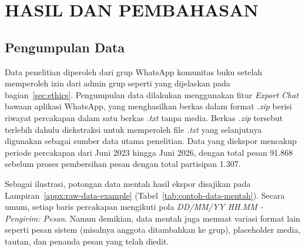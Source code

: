 %

\chapter{HASIL DAN PEMBAHASAN}

\section{Pengumpulan Data}
\label{sec:data-collection}

Data penelitian diperoleh dari grup WhatsApp komunitas buku setelah memperoleh izin dari admin grup seperti yang dijelaskan pada bagian~\ref{sec:ethics}.
Pengumpulan data dilakukan menggunakan fitur \textit{Export Chat} bawaan aplikasi WhatsApp, yang menghasilkan berkas dalam format \textit{.zip} berisi riwayat percakapan dalam satu berkas \textit{.txt} tanpa media.
Berkas \textit{.zip} tersebut terlebih dahulu diekstraksi untuk memperoleh file \textit{.txt} yang selanjutnya digunakan sebagai sumber data utama penelitian.
Data yang diekspor mencakup periode percakapan dari Juni 2023 hingga Juni 2026, dengan total pesan 91.868 sebelum proses pembersihan pesan dengan total partisipan 1.307.

Sebagai ilustrasi, potongan data mentah hasil ekspor disajikan pada Lampiran~\ref{appx:raw-data-example} (Tabel~\ref{tab:contoh-data-mentah}).
Secara umum, setiap baris percakapan mengikuti pola \textit{DD/MM/YY HH.MM - Pengirim: Pesan}.
Namun demikian, data mentah juga memuat variasi format lain seperti pesan sistem (misalnya anggota ditambahkan ke grup), placeholder media, tautan, dan penanda pesan yang telah diedit.

